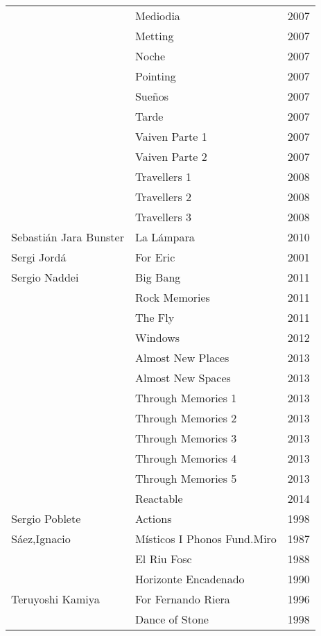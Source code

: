 \begin{center}
\begin{longtable}{ p{}  p{}  p{} }
& Mediodia & 2007 \\ \cmidrule (r){2-3} 
& Metting & 2007 \\ \cmidrule (r){2-3} 
& Noche & 2007 \\ \cmidrule (r){2-3} 
& Pointing & 2007 \\ \cmidrule (r){2-3} 
& Sueños & 2007 \\ \cmidrule (r){2-3} 
& Tarde & 2007 \\ \cmidrule (r){2-3} 
& Vaiven Parte 1 & 2007 \\ \cmidrule (r){2-3} 
& Vaiven Parte 2 & 2007 \\ \cmidrule (r){2-3} 
& Travellers 1 & 2008 \\ \cmidrule (r){2-3} 
& Travellers 2 & 2008 \\ \cmidrule (r){2-3} 
& Travellers 3 & 2008 \\ \midrule
Sebastián Jara Bunster & La Lámpara & 2010 \\ \midrule 
Sergi Jordá & For Eric & 2001 \\ \midrule 
Sergio Naddei & Big Bang & 2011 \\ \cmidrule (r){2-3} 
& Rock Memories & 2011 \\ \cmidrule (r){2-3} 
& The Fly & 2011 \\ \cmidrule (r){2-3} 
& Windows & 2012 \\ \cmidrule (r){2-3} 
& Almost New Places & 2013 \\ \cmidrule (r){2-3} 
& Almost New Spaces & 2013 \\ \cmidrule (r){2-3} 
& Through Memories 1 & 2013 \\ \cmidrule (r){2-3} 
& Through Memories 2 & 2013 \\ \cmidrule (r){2-3} 
& Through Memories 3 & 2013 \\ \cmidrule (r){2-3} 
& Through Memories 4 & 2013 \\ \cmidrule (r){2-3} 
& Through Memories 5 & 2013 \\ \cmidrule (r){2-3} 
& Reactable & 2014 \\ \midrule 
Sergio Poblete & Actions & 1998 \\ \midrule 
Sáez,Ignacio & Místicos I Phonos Fund.Miro & 1987 \\ \cmidrule (r){2-3} 
& El Riu Fosc & 1988 \\ \cmidrule (r){2-3} 
& Horizonte Encadenado & 1990 \\ \midrule 
Teruyoshi Kamiya & For Fernando Riera & 1996 \\ \cmidrule (r){2-3} 
& Dance of Stone & 1998 \\ \midrule 

\end{longtable}
\end{center}
